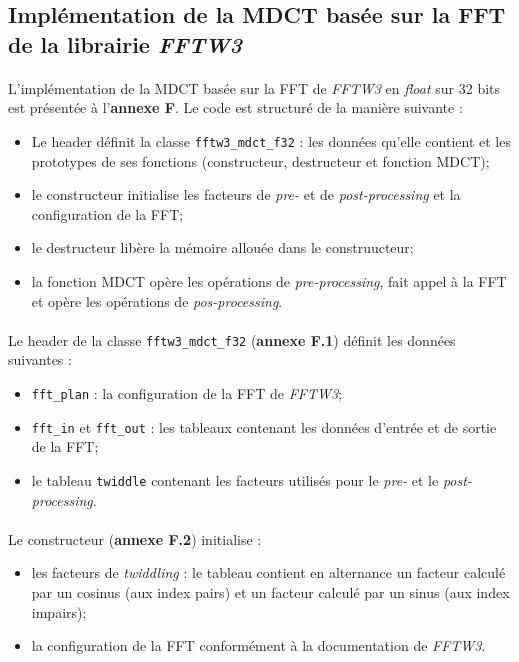 \documentclass{article}
\begin{document}
    \subsection{Implémentation de la MDCT basée sur la FFT de la librairie \emph{FFTW3}}

    \paragraph{}
    L'implémentation de la MDCT basée sur la FFT de \emph{FFTW3} en \emph{float} sur 32 bits est présentée à l'\textbf{annexe F}. Le code est structuré de la manière suivante :
    \begin{itemize}
        \item Le header définit la classe \texttt{fftw3\_mdct\_f32} : les données qu'elle contient et les prototypes de ses fonctions (constructeur, destructeur et fonction MDCT);
        \item le constructeur initialise les facteurs de \emph{pre-} et de \emph{post-processing} et la configuration de la FFT;
        \item le destructeur libère la mémoire allouée dans le construucteur;
        \item la fonction MDCT opère les opérations de \emph{pre-processing}, fait appel à la FFT et opère les opérations de \emph{pos-processing}.
    \end{itemize}

    \paragraph{}
    Le header de la classe \texttt{fftw3\_mdct\_f32} (\textbf{annexe F.1}) définit les données suivantes :
    \begin{itemize}
        \item \texttt{fft\_plan} : la configuration de la FFT de \emph{FFTW3};
        \item \texttt{fft\_in} et \texttt{fft\_out} : les tableaux contenant les données d'entrée et de sortie de la FFT;
        \item le tableau \texttt{twiddle} contenant les facteurs utilisés pour le \emph{pre-} et le \emph{post-processing}.
    \end{itemize}

    \paragraph{}
    Le constructeur (\textbf{annexe F.2}) initialise :
    \begin{itemize}
        \item les facteurs de \emph{twiddling} : le tableau contient en alternance un facteur calculé par un cosinus (aux index pairs) et un facteur calculé par un sinus (aux index impairs);
        \item la configuration de la FFT conformément à la documentation de \emph{FFTW3}.
    \end{itemize}
\end{document}
